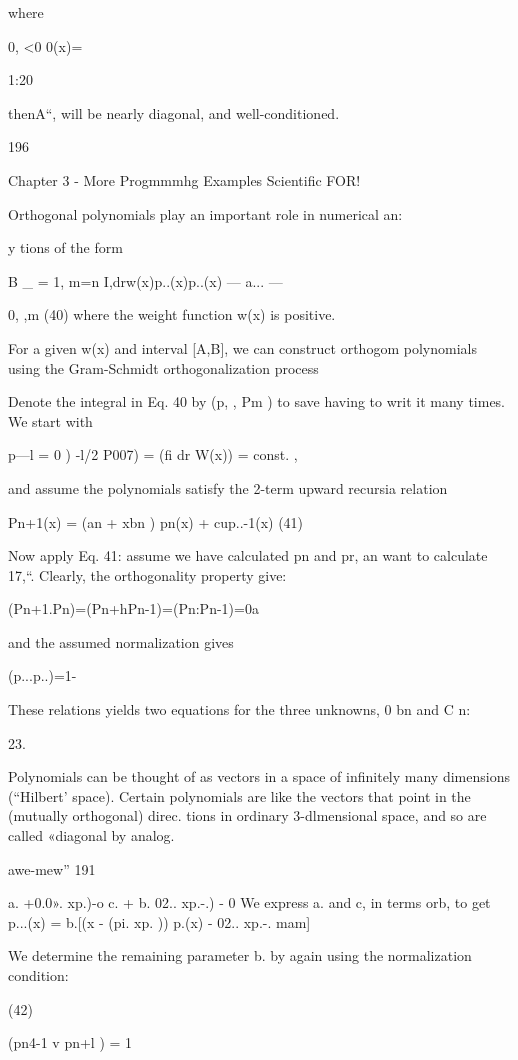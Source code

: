 where

0, <0
0(x)={1:20

thenA“, will be nearly diagonal, and well-conditioned.

196

Chapter 3 - More Progmmmhg Examples Scientiﬁc FOR!

Orthogonal polynomials play an important role in numerical an:

y%
tions of the form

B _ = 1, m=n
I,drw(x)p..(x)p..(x) — a... — {0, ,m (40)
where the weight function w(x) is positive.

For a given w(x) and interval [A,B], we can construct orthogom
polynomials using the Gram-Schmidt orthogonalization process

Denote the integral in Eq. 40 by (p, , Pm ) to save having to writ
it many times. We start with

p—l = 0 )
-l/2
P007) = (fi dr W(x)) = const. ,

and assume the polynomials satisfy the 2-term upward recursia
relation

Pn+1(x) = (an + xbn ) pn(x) + cup..-1(x) (41)

Now apply Eq. 41: assume we have calculated pn and pr, an
want to calculate 17,“. Clearly, the orthogonality property give:

(Pn+1.Pn)=(Pn+hPn-1)=(Pn:Pn-1)=0a

and the assumed normalization gives

(p...p..)=1-

These relations yields two equations for the three unknowns, 0
bn and C n:

 

23.

Polynomials can be thought of as vectors in a space of inﬁnitely many dimensions (“Hilbert'
space). Certain polynomials are like the vectors that point in the (mutually orthogonal) direc.
tions in ordinary 3-dlmensional space, and so are called «diagonal by analog.

awe-mew” 191

a. +0.0». xp.)-o
c. + b. 02.. xp.-.) - 0
We express a. and c, in terms orb, to get
p...(x) = b.[(x - (pi. xp. )) p.(x)
- 02.. xp.-. mam]

We determine the remaining parameter b. by again using the
normalization condition:

(42)

(pn4-1 v pn+l ) = 1

}}
